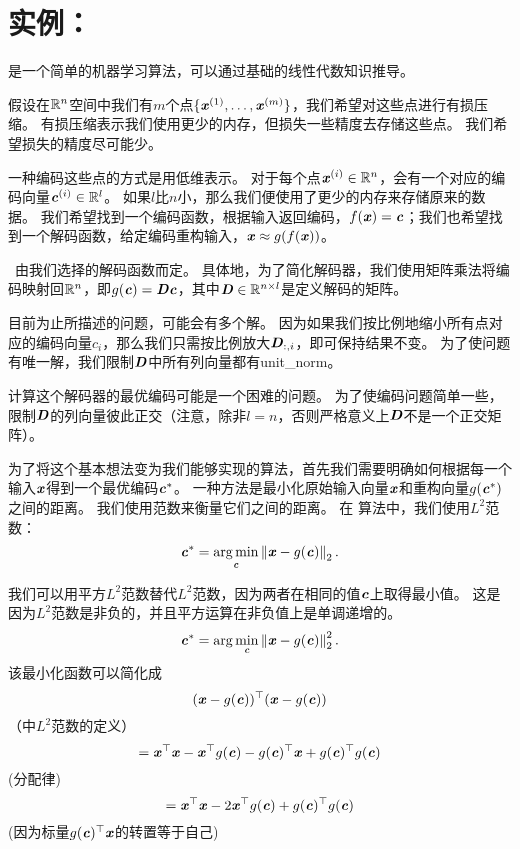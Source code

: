 \section{实例：}
\label{sec:example_principal_components_analysis_chap2}

是一个简单的机器学习算法，可以通过基础的线性代数知识推导。


假设在$\SetR^n$空间中我们有$m$个点$\{\Vx^{(1)}, \dots ,\Vx^{(m)}\}$，我们希望对这些点进行有损压缩。
有损压缩表示我们使用更少的内存，但损失一些精度去存储这些点。
我们希望损失的精度尽可能少。


一种编码这些点的方式是用低维表示。
对于每个点$\Vx^{(i)} \in \SetR^n$，会有一个对应的编码向量$\Vc^{(i)}\in \SetR^l$。
如果$l$比$n$小，那么我们便使用了更少的内存来存储原来的数据。
我们希望找到一个编码函数，根据输入返回编码，$f(\Vx)=\Vc$；我们也希望找到一个解码函数，给定编码重构输入，$\Vx\approx g(f(\Vx))$。


~由我们选择的解码函数而定。
具体地，为了简化解码器，我们使用矩阵乘法将编码映射回$\SetR^n$，即$g(\Vc)=\MD\Vc$，其中$\MD\in \SetR^{n\times l}$是定义解码的矩阵。


目前为止所描述的问题，可能会有多个解。
因为如果我们按比例地缩小所有点对应的编码向量$c_i$，那么我们只需按比例放大$\MD_{:,i}$，即可保持结果不变。
为了使问题有唯一解，我们限制$\MD$中所有列向量都有\gls{unit_norm}。


计算这个解码器的最优编码可能是一个困难的问题。
为了使编码问题简单一些，\,限制$\MD$的列向量彼此正交（注意，除非$l=n$，否则严格意义上$\MD$不是一个正交矩阵）。


为了将这个基本想法变为我们能够实现的算法，首先我们需要明确如何根据每一个输入$\Vx$得到一个最优编码$\Vc^*$。
一种方法是最小化原始输入向量$\Vx$和重构向量$g(\Vc^*)$之间的距离。
我们使用范数来衡量它们之间的距离。
在\,\,算法中，我们使用$L^2$范数：
\begin{equation}
 \Vc^* = \underset{\Vc}{\arg\min} \norm{\Vx-g(\Vc)}_2.
\end{equation}


我们可以用平方$L^2$范数替代$L^2$范数，因为两者在相同的值$\Vc$上取得最小值。
这是因为$L^2$范数是非负的，并且平方运算在非负值上是单调递增的。
\begin{equation}
\Vc^* = \argmin_{\Vc} \norm{\Vx - g(\Vc)}_2^2.
\end{equation}
该最小化函数可以简化成
\begin{equation}
(\Vx-g(\Vc))^\top(\Vx-g(\Vc))
\end{equation}
（中$L^2$范数的定义）
\begin{equation}
    = \Vx^\top\Vx - \Vx^\top g(\Vc) - g(\Vc)^\top\Vx + g(\Vc)^\top g(\Vc)
\end{equation}
(分配律)
\begin{equation}
    = \Vx^\top \Vx - 2\Vx^\top g(\Vc) + g(\Vc)^\top g(\Vc)
\end{equation}
(因为标量$g(\Vc)^\top\Vx$的转置等于自己)


